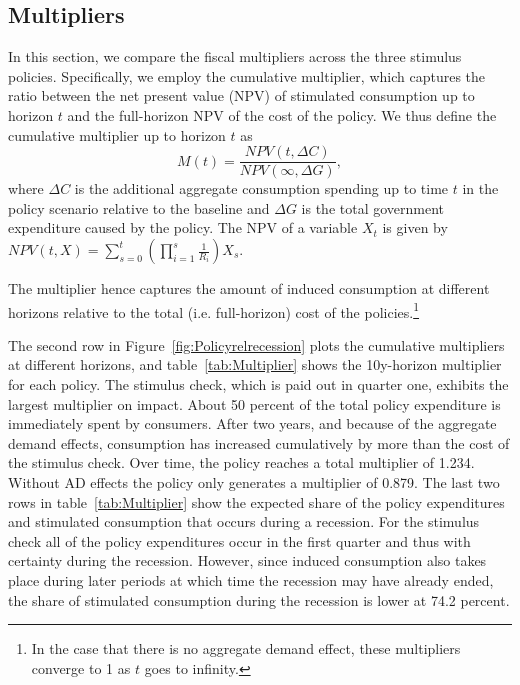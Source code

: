 \documentclass[qe]{econsocart}
\begin{document}
\subsection{Multipliers}
\label{sec:multipliers} 

In this section, we compare the fiscal multipliers across the three stimulus policies.
Specifically, we employ the cumulative multiplier, which captures the ratio between the net present value (NPV) of stimulated consumption up to horizon $t$ and the full-horizon NPV of the cost of the policy.
We thus define the cumulative multiplier up to horizon $t$ as
\begin{equation}
  \label{eqn:cumMultiplier} 
  M(t) = \frac{NPV(t,\Delta C)}{NPV (\infty,\Delta G)},
\end{equation}
where $\Delta C$ is the additional aggregate consumption spending up to time $t$ in the policy scenario relative to the baseline and $\Delta G$ is the total government expenditure caused by the policy.
The NPV of a variable $X_t$ is given by
$NPV(t,X) = \sum_{s=0}^{t} \left( \prod_{i=1}^{s} \frac{1}{R_i} \right) X_s$.

The multiplier hence captures the amount of induced consumption at different horizons relative to the total (i.e.
full-horizon) cost of the policies.\footnote{In the case that there is no aggregate demand effect, these multipliers converge to 1 as $t$ goes to infinity.}

The second row in Figure~\ref{fig:Policyrelrecession} plots the cumulative multipliers at different horizons, and table~\ref{tab:Multiplier} shows the 10y-horizon multiplier for each policy.
The stimulus check, which is paid out in quarter one, exhibits the largest multiplier on impact.
About 50 percent of the total policy expenditure is immediately spent by consumers.
After two years, and because of the aggregate demand effects, consumption has increased cumulatively by more than the cost of the stimulus check.
Over time, the policy reaches a total multiplier of 1.234.
Without AD effects the policy only generates a multiplier of 0.879.
The last two rows in table~\ref{tab:Multiplier} show the expected share of the policy expenditures and stimulated consumption that occurs during a recession.
For the stimulus check all of the policy expenditures occur in the first quarter and thus with certainty during the recession.
However, since induced consumption also takes place during later periods at which time the recession may have already ended, the share of stimulated consumption during the recession is lower at 74.2 percent.
\end{document}
